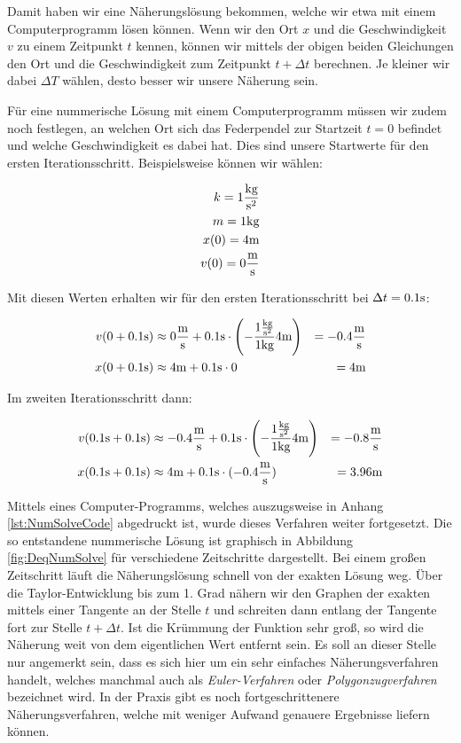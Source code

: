 Damit haben wir eine Näherungslösung bekommen, welche wir etwa mit einem Computerprogramm lösen können. Wenn wir den Ort $x$ und die Geschwindigkeit $v$ zu einem Zeitpunkt $t$ kennen, können wir mittels der obigen beiden Gleichungen den Ort und die Geschwindigkeit zum Zeitpunkt $t+\Delta t$ berechnen. Je kleiner wir dabei $\Delta T$ wählen, desto besser wir unsere Näherung sein.

Für eine nummerische Lösung mit einem Computerprogramm müssen wir zudem noch festlegen, an welchen Ort sich das Federpendel zur Startzeit $t=0$ befindet und welche Geschwindigkeit es dabei hat. Dies sind unsere Startwerte für den ersten Iterationsschritt. Beispielsweise können wir wählen:

\begin{alignat*}{1}
    k = 1 \frac{\text{kg}}{\text{s}^2} \\
    m = 1 \text{kg} \\
    x(0) = 4 \text{m} \\
    v(0) = 0 \frac{\text{m}}{\text{s}}
\end{alignat*}

Mit diesen Werten erhalten wir für den ersten Iterationsschritt  bei $\Delta t=0.1\text{s}$:

\begin{alignat*}{2}
    v(0 + 0.1 \text{s}) &\approx 0 \frac{\text{m}}{\text{s}} + 0.1 \text{s} \cdot \left(-\frac{1 \frac{\text{kg}}{\text{s}^2}}{1\text{kg}}4 \text{m} \right) &= -0.4 \frac{\text{m}}{\text{s}} \\
    x(0 + 0.1 \text{s}) &\approx 4 \text{m}     + 0.1 \text{s} \cdot 0                                          &= 4 \text{m}
\end{alignat*}

Im zweiten Iterationsschritt dann:

\begin{alignat*}{2}
    v(0.1\text{s} + 0.1 \text{s}) &\approx -0.4 \frac{\text{m}}{\text{s}} + 0.1 \text{s} \cdot \left(-\frac{1 \frac{\text{kg}}{\text{s}^2}}{1\text{kg}} 4 \text{m} \right) &= -0.8 \frac{\text{m}}{\text{s}} \\
    x(0.1\text{s} + 0.1 \text{s}) &\approx 4    \text{m}     + 0.1 \text{s} \cdot (-0.4 \frac{\text{m}}{\text{s}})                              &= 3.96 \text{m}
\end{alignat*}

Mittels eines Computer-Programms, welches auszugsweise in Anhang \ref{lst:NumSolveCode} abgedruckt ist, wurde dieses Verfahren weiter fortgesetzt. Die so entstandene nummerische Lösung ist graphisch in Abbildung \ref{fig:DeqNumSolve} für verschiedene Zeitschritte dargestellt. Bei einem großen Zeitschritt läuft die Näherungslösung schnell von der exakten Lösung weg. Über die Taylor-Entwicklung bis zum 1. Grad nähern wir den Graphen der exakten mittels einer Tangente an der Stelle $t$ und schreiten dann entlang der Tangente fort zur Stelle $t+\Delta t$. Ist die Krümmung der Funktion sehr groß, so wird die Näherung weit von dem eigentlichen Wert entfernt sein. Es soll an dieser Stelle nur angemerkt sein, dass es sich hier um ein sehr einfaches Näherungsverfahren handelt, welches manchmal auch als \emph{Euler-Verfahren} oder \emph{Polygonzugverfahren} bezeichnet wird. In der Praxis gibt es noch fortgeschrittenere Näherungsverfahren, welche mit weniger Aufwand genauere Ergebnisse liefern können.

